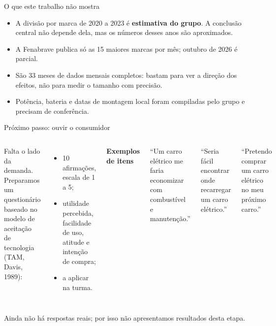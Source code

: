\documentclass[aspectratio=169,11pt]{beamer}
\begin{document}
\begin{frame}{O que este trabalho não mostra}
\begin{itemize}
\item A divisão por marca de 2020 a 2023 é \textbf{estimativa do grupo}. A conclusão central não depende dela, mas os números desses anos são aproximados.
\item A Fenabrave publica só as 15 maiores marcas por mês; outubro de 2026 é parcial.
\item São 33 meses de dados mensais completos: bastam para ver a direção dos efeitos, não para medir o tamanho com precisão.
\item Potência, bateria e datas de montagem local foram compiladas pelo grupo e precisam de conferência.
\end{itemize}
\end{frame}

\begin{frame}{Próximo passo: ouvir o consumidor}
\begin{columns}[T]
Falta o lado da demanda. Preparamos um questionário baseado no modelo de aceitação de tecnologia (TAM, Davis, 1989):
\begin{itemize}
\item 10 afirmações, escala de 1 a 5;
\item utilidade percebida, facilidade de uso, atitude e intenção de compra;
\item a aplicar na turma.
\end{itemize}
\textbf{Exemplos de itens}\par\vspace{4pt}
{\small ``Um carro elétrico me faria economizar com combustível e manutenção.''\par\vspace{6pt}
``Seria fácil encontrar onde recarregar um carro elétrico.''\par\vspace{6pt}
``Pretendo comprar um carro elétrico no meu próximo carro.''}
\end{columns}
\vspace{10pt}
{\small\color{cinza}Ainda não há respostas reais; por isso não apresentamos resultados desta etapa.}
\end{frame}
\end{document}
